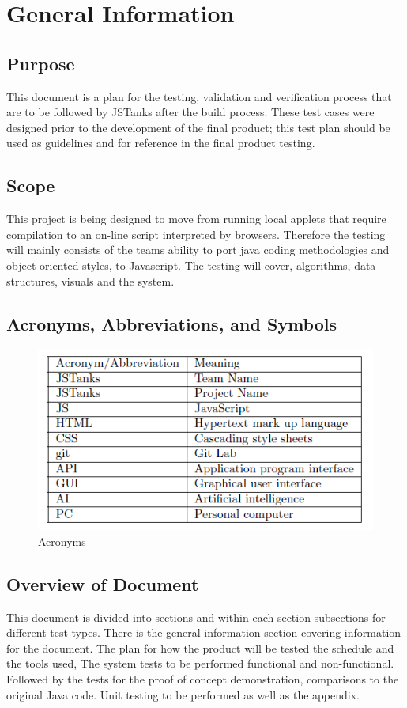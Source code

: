 \documentclass{article}
\begin{document}
\section{General Information}
\subsection{Purpose}
This document is a plan for the testing, validation and verification process 
that are to be followed by JSTanks after the build process. These test cases 
were designed prior to the development of the final product; this test plan 
should be used as guidelines and for reference in the final product testing. 

\subsection{Scope}
This project is being designed to move from running local applets that require 
compilation to an on-line script interpreted by browsers. Therefore the 
testing will mainly consists of the teams ability to port java coding 
methodologies and object oriented styles, to Javascript. The testing will 
cover, algorithms, data structures, visuals and the system. 

\subsection{Acronyms, Abbreviations, and Symbols}
\begin{figure}[H]
	\centering
	\includegraphics[width=\textwidth]{fig1.png}
	\caption{Acronyms}
\end{figure}

\subsection{Overview of Document}
This document is divided into sections and within each section subsections for 
different test types. There is the general information section covering 
information for the document. The plan for how the product will be tested the 
schedule and the tools used, The system tests to be performed functional and 
non-functional. Followed by the tests for the proof of concept demonstration, 
comparisons to the original Java code. Unit testing to be performed as well as 
the appendix. 
\end{document}
